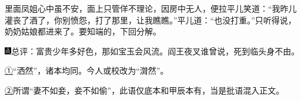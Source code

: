 里面凤姐心中虽不安，面上只管佯不理论，因房中无人，便拉平儿笑道：``我昨儿灌丧了酒了，你别愤怨，打了那里，让我瞧瞧。''平儿道：``也没打重。''只听得说，奶奶姑娘都进来了。要知端的，下回分解。

{\includegraphics[width=3mm]{../Images/00005}总评：富贵少年多好色，那如宝玉会风流。阎王夜叉谁曾说，死到临头身不由。}

{\href{../Text/part0048_split_000.html\#navto_1_a}{①}``洒然''，诸本均同。今人或校改为``潸然''。}

{\href{../Text/part0048_split_000.html\#navto_2_a}{②}所谓``妻不如妾，妾不如偷''，此语仅底本和甲辰本有，当是批语混入正文。}
